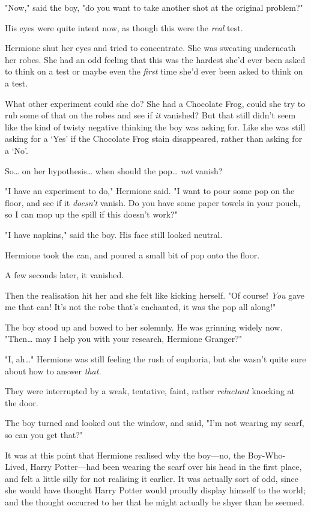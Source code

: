 "Now," said the boy, "do you want to take another shot at the original problem?"

His eyes were quite intent now, as though this were the \emph{real} test.

Hermione shut her eyes and tried to concentrate. She was sweating underneath
her robes. She had an odd feeling that this was the hardest she'd ever been
asked to think on a test or maybe even the \emph{first} time she'd ever been
asked to think on a test.

What other experiment could she do? She had a Chocolate Frog, could she try to
rub some of that on the robes and see if \emph{it} vanished? But that still
didn't seem like the kind of twisty negative thinking the boy was asking for.
Like she was still asking for a `Yes' if the Chocolate Frog stain disappeared,
rather than asking for a `No'.

So{\ldots} on her hypothesis{\ldots} when should the pop{\ldots} \emph{not}
vanish?

"I have an experiment to do," Hermione said. "I want to pour some pop on the
floor, and see if it \emph{doesn't} vanish. Do you have some paper towels in
your pouch, so I can mop up the spill if this doesn't work?"

"I have napkins," said the boy. His face still looked neutral.

Hermione took the can, and poured a small bit of pop onto the floor.

A few seconds later, it vanished.

Then the realisation hit her and she felt like kicking herself. "Of course!
\emph{You} gave me that can! It's not the robe that's enchanted, it was the pop
all along!"

The boy stood up and bowed to her solemnly. He was grinning widely now.
"Then{\ldots} may I help you with your research, Hermione Granger?"

"I, ah{\ldots}" Hermione was still feeling the rush of euphoria, but she wasn't
quite sure about how to answer \emph{that.}

They were interrupted by a weak, tentative, faint, rather \emph{reluctant}
knocking at the door.

The boy turned and looked out the window, and said, "I'm not wearing my scarf,
so can you get that?"

It was at this point that Hermione realised why the boy---no, the
Boy-Who-Lived, Harry Potter---had been wearing the scarf over his head in the
first place, and felt a little silly for not realising it earlier. It was
actually sort of odd, since she would have thought Harry Potter would proudly
display himself to the world; and the thought occurred to her that he might
actually be shyer than he seemed.

